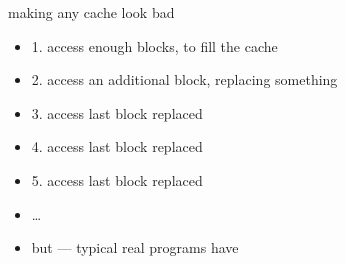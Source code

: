 
\begin{frame}{making any cache look bad}
    \begin{itemize}
    \item 1. access enough blocks, to fill the cache
    \item 2. access an additional block, replacing something
    \item 3. access last block replaced
    \item 4. access last block replaced
    \item 5. access last block replaced
    \item \ldots
        \vspace{.5cm}
    \item but --- typical real programs have 
    \end{itemize}
\end{frame}

